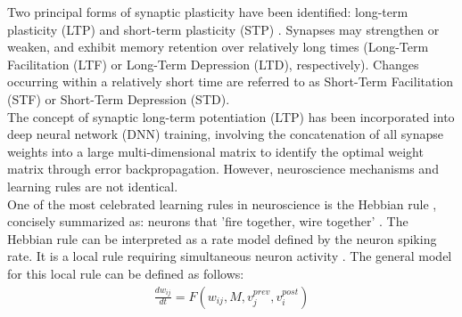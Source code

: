\noindent Two principal forms of synaptic plasticity have been identified: long-term plasticity (LTP) \cite{bear1994synaptic} and short-term plasticity (STP) \cite{zucker2002short}. Synapses may strengthen or weaken, and exhibit memory retention over relatively long times (Long-Term Facilitation (LTF) or Long-Term Depression (LTD), respectively). Changes occurring within a relatively short time are referred to as Short-Term Facilitation (STF) or Short-Term Depression (STD).\\


\noindent The concept of synaptic long-term potentiation (LTP) has been incorporated into deep neural network (DNN) training, involving the concatenation of all synapse weights into a large multi-dimensional matrix to identify the optimal weight matrix through error backpropagation. However, neuroscience mechanisms and learning rules are not identical.\\

\noindent One of the most celebrated learning rules in neuroscience is the Hebbian rule \cite{hebb2002organization}, concisely summarized as: neurons that 'fire together, wire together' \cite{shatz1992developing}. The Hebbian rule can be interpreted as a rate model defined by the neuron spiking rate. It is a local rule requiring simultaneous neuron activity \cite{gerstner2014neuronal}. The general model for this local rule can be defined as follows:
\begin{align}
\frac{dw_{ij}}{dt} = F\left( w_{ij},M,v^{prev}_j,v^{post}_i \right) \label{eq:6.4} 
\end{align}

